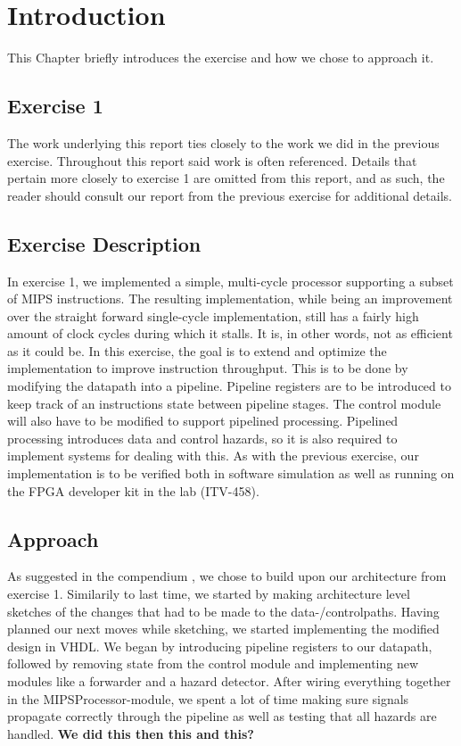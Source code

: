 \chapter{Introduction}
This Chapter briefly introduces the exercise and how we chose to approach it.

\section{Exercise 1}

The work underlying this report ties closely to the work we did in the previous exercise.
Throughout this report said work is often referenced.
Details that pertain more closely to exercise 1 are omitted from this report, and as such, the reader should consult our report from the previous exercise \cite{ex1report} for additional details.

\section{Exercise Description}

In exercise 1, we implemented a simple, multi-cycle processor supporting a subset of MIPS instructions.
The resulting implementation, while being an improvement over the straight forward single-cycle implementation, still has a fairly high amount of clock cycles during which it stalls.
It is, in other words, not as efficient as it could be.
In this exercise, the goal is to extend and optimize the implementation to improve instruction throughput.
This is to be done by modifying the datapath into a pipeline.
Pipeline registers are to be introduced to keep track of an instructions state between pipeline stages.
The control module will also have to be modified to support pipelined processing.
Pipelined processing introduces data and control hazards, so it is also required to implement systems for dealing with this.
As with the previous exercise, our implementation is to be verified both in software simulation as well as running on the FPGA developer kit in the lab (ITV-458).


\section{Approach}

As suggested in the compendium \cite{compendium}, we chose to build upon our architecture from exercise 1.
Similarily to last time, we started by making architecture level sketches of the changes that had to be made to the data-/controlpaths.
Having planned our next moves while sketching, we started implementing the modified design in VHDL.
We began by introducing pipeline registers to our datapath, followed by removing state from the control module and implementing new modules like a forwarder and a hazard detector.
After wiring everything together in the MIPSProcessor-module, we spent a lot of time making sure signals propagate correctly through the pipeline as well as testing that all hazards are handled. \textbf{We did this then this and this?}

